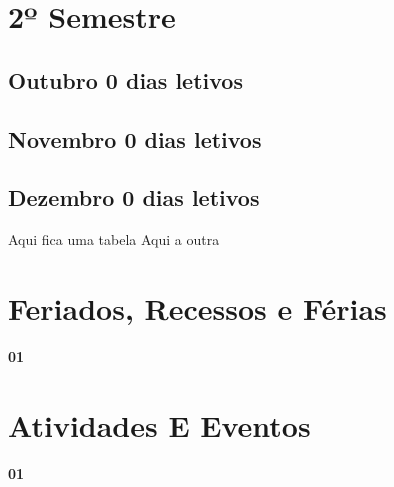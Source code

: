 \documentclass[thesis]{hmcposter}
\begin{document}
\begin{poster}
\section{\hfill \color{hmcorange}2º Semestre}
\subsection{Outubro \hfill 0 dias letivos}\subsection{Novembro \hfill 0 dias letivos}\subsection{Dezembro \hfill 0 dias letivos}\newpage
Aqui fica uma tabela
\vfill\null
\columnbreak
Aqui a outra
\newpage
				\section{\color{hmcorange}Feriados, Recessos e Férias}\textbf{01}\quad {} \newline\newpage\section{\color{hmcorange}Atividades E Eventos}\textbf{01}\quad {} \newline\end{poster}
\end{document}
